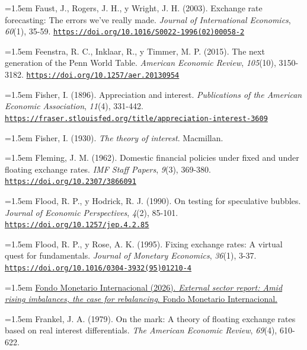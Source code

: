\documentclass[10pt,a4paper]{article}
\begin{document}
\noindent\hangindent=1.5em Faust, J., Rogers, J. H., y Wright, J. H. (2003). Exchange rate forecasting: The errors we've really made. \textit{Journal of International Economics}, \textit{60}(1), 35-59. \href{https://doi.org/10.1016/S0022-1996(02)00058-2}{\nolinkurl{https://doi.org/10.1016/S0022-1996(02)00058-2}}

\noindent\hangindent=1.5em Feenstra, R. C., Inklaar, R., y Timmer, M. P. (2015). The next generation of the Penn World Table. \textit{American Economic Review}, \textit{105}(10), 3150-3182. \href{https://doi.org/10.1257/aer.20130954}{\nolinkurl{https://doi.org/10.1257/aer.20130954}}

\noindent\hangindent=1.5em Fisher, I. (1896). Appreciation and interest. \textit{Publications of the American Economic Association}, \textit{11}(4), 331-442. \href{https://fraser.stlouisfed.org/title/appreciation-interest-3609}{\nolinkurl{https://fraser.stlouisfed.org/title/appreciation-interest-3609}}

\noindent\hangindent=1.5em Fisher, I. (1930). \textit{The theory of interest}. Macmillan.

\noindent\hangindent=1.5em Fleming, J. M. (1962). Domestic financial policies under fixed and under floating exchange rates. \textit{IMF Staff Papers}, \textit{9}(3), 369-380. \href{https://doi.org/10.2307/3866091}{\nolinkurl{https://doi.org/10.2307/3866091}}

\noindent\hangindent=1.5em Flood, R. P., y Hodrick, R. J. (1990). On testing for speculative bubbles. \textit{Journal of Economic Perspectives}, \textit{4}(2), 85-101. \href{https://doi.org/10.1257/jep.4.2.85}{\nolinkurl{https://doi.org/10.1257/jep.4.2.85}}

\noindent\hangindent=1.5em Flood, R. P., y Rose, A. K. (1995). Fixing exchange rates: A virtual quest for fundamentals. \textit{Journal of Monetary Economics}, \textit{36}(1), 3-37. \href{https://doi.org/10.1016/0304-3932(95)01210-4}{\nolinkurl{https://doi.org/10.1016/0304-3932(95)01210-4}}

\noindent\hangindent=1.5em \href{https://www.imf.org/en/Publications/ESR}{Fondo Monetario Internacional (2026). \textit{External sector report: Amid rising imbalances, the case for rebalancing}. Fondo Monetario Internacional.}

\noindent\hangindent=1.5em Frankel, J. A. (1979). On the mark: A theory of floating exchange rates based on real interest differentials. \textit{The American Economic Review}, \textit{69}(4), 610-622.
\end{document}
